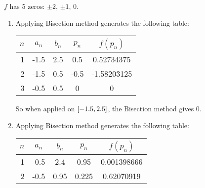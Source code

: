 \documentclass[../../Assignments.tex]{subfiles}
\begin{document}
\begin{solution}
    \(f\) has 5 zeros: \(\pm 2\), \(\pm 1\), \(0\).

    \begin{enumerate}[label = (\alph*)]
        \item Applying Bisection method generates the following table:

            \begin{table}[H]
                \centering
                \begin{tabular}{r S[table-format=-1.1] S[table-format=1.1] S[table-format=-1.1] S[table-format=-1.8]}
                    \toprule
                    \(n\)  &   {\(a_n\)}   &   {\(b_n\)}   &   {\(p_n\)}   &  {\(f(p_n)\)}  \\
                      &  -1.5         &  2.5          &   0.5         &   0.52734375   \\
                        2  &  -1.5         &  0.5          &  -0.5         &  -1.58203125   \\
                        3  &  -0.5         &  0.5          &   0           &   0            \\
                    \bottomrule
                \end{tabular}
            \end{table}

            So when applied on \(\interval{\num{-1.5}}{\num{2.5}}\), the
            Bisection method gives \(0\).

        \item Applying Bisection method generates the following table:

            \begin{table}[H]
                \centering
                \begin{tabular}{r S[table-format=-1.1] S[table-format=1.2] S[table-format=1.3] S[table-format=1.9]}
                    \toprule
                    \(n\)  &   {\(a_n\)}   &   {\(b_n\)}   &   {\(p_n\)}   &  {\(f(p_n)\)}  \\
                      &  -0.5         &  2.4          &  0.95         &  0.001398666   \\
                        2  &  -0.5         &  0.95         &  0.225        &  0.62070919    \\
                    \bottomrule
                \end{tabular}
            \end{table}


\end{enumerate}
\end{solution}
\end{document}
